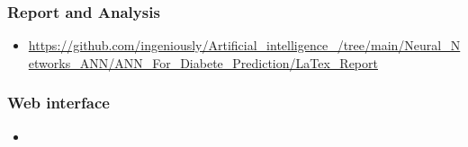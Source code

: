 \documentclass[rnd]{mas_proposal}
\begin{document}
\subsubsection*{Report and Analysis}
\begin{itemize}
    \item \url{https://github.com/ingeniously/Artificial_intelligence_/tree/main/Neural_Networks_ANN/ANN_For_Diabete_Prediction/LaTex_Report}
\end{itemize}

\subsubsection*{Web interface}
\begin{itemize}
    \item \url{}
\end{itemize}


\nocite{*}
\end{document}
